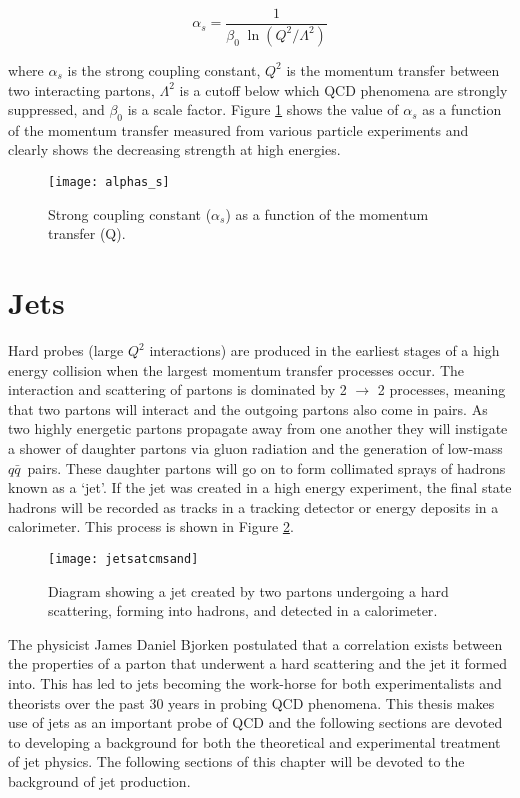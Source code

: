 \begin{equation}
\alpha_{s} = \frac{1}{\beta_{0} \; \ln(Q^{2}/\Lambda^{2} )}
\label{eq:alpha_s}
\end{equation}

\noindent
where $\alpha_{s}$ is the strong coupling constant, $Q^{2}$ is the momentum transfer between two interacting partons, $\Lambda^{2}$ is a cutoff below which QCD phenomena are strongly suppressed, and $\beta_{0}$ is a scale factor.  Figure \ref{fig:as} shows the value of $\alpha_{s}$ as a function of the momentum transfer measured from various particle experiments and clearly shows the decreasing strength at high energies.

\begin{figure}[h]
\texttt{[image: alphas\_s]}
\centering
\caption{Strong coupling constant ($\alpha_{s}$) as a function of the momentum transfer (Q)\cite{CMS:2014mna}.}
\label{fig:as}
\end{figure}

\section{Jets}

Hard probes (large $Q^{2}$ interactions) are produced in the earliest stages of a high energy collision when the largest momentum transfer processes occur.  The interaction and scattering of partons is dominated by 2 $\rightarrow$ 2 processes, meaning that two partons will interact and the outgoing partons also come in pairs.  As two highly energetic partons propagate away from one another they will instigate a shower of daughter partons via gluon radiation and the generation of low-mass $q \bar{q}$\, pairs.  These daughter partons will go on to form collimated sprays of hadrons known as a `jet'.  If the jet was created in a high energy experiment, the final state hadrons will be recorded as tracks in a tracking detector or energy deposits in a calorimeter.  This process is shown in Figure \ref{fig:MakeAJet}.



\begin{figure}[h]
\texttt{[image: jetsatcmsand]}
\centering
\caption{Diagram showing a jet created by two partons undergoing a hard scattering, forming into hadrons, and detected in a calorimeter\cite{JetPic}.}
\label{fig:MakeAJet}
\end{figure}

The physicist James Daniel Bjorken postulated that a correlation exists between the properties of a parton that underwent a hard scattering and the jet it formed into\cite{PhysRev.179.1547}\cite{Bjorken:1973kd}.  This has led to jets becoming the work-horse for both experimentalists and theorists over the past 30 years in probing QCD phenomena.  This thesis makes use of jets as an important probe of QCD and the following sections are devoted to developing a background for both the theoretical and experimental treatment of jet physics.  The following sections of this chapter will be devoted to the background of jet production.


